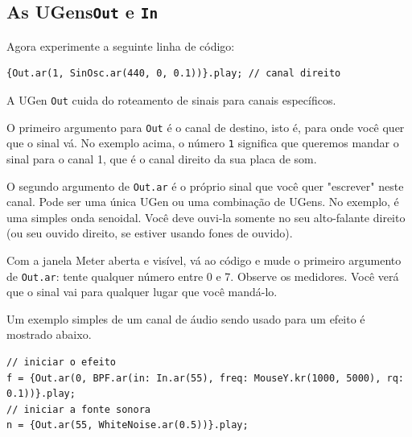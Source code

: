 \subsection{As UGens\texttt{Out} e \texttt{In}}

Agora experimente a seguinte linha de código:

\begin{lstlisting}[style=SuperCollider-IDE, basicstyle=\scttfamily\footnotesize]
{Out.ar(1, SinOsc.ar(440, 0, 0.1))}.play; // canal direito
\end{lstlisting}

A UGen \texttt{Out} cuida do roteamento de sinais para canais específicos.

O primeiro argumento para \texttt{Out} é o canal de destino, isto é, para onde você quer que o sinal vá. No exemplo acima, o número \texttt{1} significa que queremos mandar o sinal para o canal 1, que é o canal direito da sua placa de som.

O segundo argumento de \texttt{Out.ar} é o próprio sinal que você quer "escrever" neste canal. Pode ser uma única UGen ou uma combinação de UGens. No exemplo, é uma simples onda senoidal. Você deve ouvi-la somente no seu alto-falante direito (ou seu ouvido direito, se estiver usando fones de ouvido).

Com a janela Meter aberta e visível, vá ao código e mude o primeiro argumento de \texttt{Out.ar}: tente qualquer número entre 0 e 7. Observe os medidores. Você verá que o sinal vai para qualquer lugar que você mandá-lo.

\bigskip
{}
\bigskip

Um exemplo simples de um canal de áudio sendo usado para um efeito é mostrado abaixo.

\begin{lstlisting}[style=SuperCollider-IDE, basicstyle=\scttfamily\footnotesize]
// iniciar o efeito
f = {Out.ar(0, BPF.ar(in: In.ar(55), freq: MouseY.kr(1000, 5000), rq: 0.1))}.play;
// iniciar a fonte sonora
n = {Out.ar(55, WhiteNoise.ar(0.5))}.play;
\end{lstlisting}

